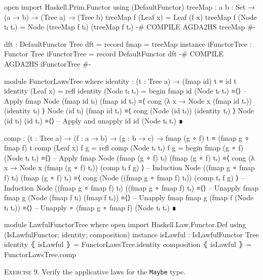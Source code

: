 \documentclass{article}
\begin{document}
\begin{code}
open import Haskell.Prim.Functor using (DefaultFunctor)
treeMap : {a b : Set} → (a → b) → (Tree a) → (Tree b)
treeMap f (Leaf x) = Leaf (f x)
treeMap f (Node tₗ tᵣ) = Node (treeMap f tₗ) (treeMap f tᵣ)
{-# COMPILE AGDA2HS treeMap #-}
\end{code}
\begin{code}
dft : DefaultFunctor Tree
dft = record { fmap = treeMap }
instance
  iFunctorTree : Functor Tree
  iFunctorTree = record { DefaultFunctor dft }
  {-# COMPILE AGDA2HS iFunctorTree #-}
\end{code}
\begin{code}
module FunctorLawsTree where
  identity : (t : Tree a) → (fmap id) t ≡ id t
  identity (Leaf x) = refl
  identity (Node tₗ tᵣ) =
    begin
      fmap id (Node tₗ tᵣ)
    ≡⟨⟩ -- Apply fmap
      Node (fmap id tₗ) (fmap id tᵣ)
    ≡⟨ cong (λ x → Node x (fmap id tᵣ)) (identity tₗ) ⟩
      Node (id tₗ) (fmap id tᵣ)
    ≡⟨ cong (Node (id tₗ)) (identity tᵣ) ⟩
      Node (id tₗ) (id tᵣ)
    ≡⟨⟩ -- Apply and unapply id
      id (Node tₗ tᵣ)
    ∎
\end{code}
\begin{code}
  comp : (t : Tree a) → (f : a → b) → (g : b → c)
    → fmap (g ∘ f) t ≡ (fmap g ∘ fmap f) t
  comp (Leaf x) f g = refl
  comp (Node tₗ tᵣ) f g =
    begin
      fmap (g ∘ f) (Node tₗ tᵣ)
    ≡⟨⟩ -- Apply fmap
      Node (fmap (g ∘ f) tₗ) (fmap (g ∘ f) tᵣ)
    ≡⟨ cong (λ x → Node x (fmap (g ∘ f) tᵣ)) (comp tₗ f g) ⟩ -- Induction
      Node ((fmap g ∘ fmap f) tₗ) (fmap (g ∘ f) tᵣ)
    ≡⟨ cong (Node ((fmap g ∘ fmap f) tₗ)) (comp tᵣ f g) ⟩ -- Induction
      Node ((fmap g ∘ fmap f) tₗ) ((fmap g ∘ fmap f) tᵣ)
    ≡⟨⟩ -- Unapply fmap
      fmap g (Node (fmap f tₗ) (fmap f tᵣ))
    ≡⟨⟩ -- Unapply fmap
      fmap g (fmap f (Node tₗ tᵣ))
    ≡⟨⟩ -- Unapply ∘
      (fmap g ∘ fmap f) (Node tₗ tᵣ)
    ∎
\end{code}
\begin{code}
module LawfulFunctorTree where
  open import Haskell.Law.Functor.Def
    using (IsLawfulFunctor; identity; composition)
  instance
    isLawful : IsLawfulFunctor Tree
    identity ⦃ isLawful ⦄ = FunctorLawsTree.identity
    composition ⦃ isLawful ⦄ = FunctorLawsTree.comp
\end{code}

\noindent
\textsc{Exercise 9.} Verify the applicative laws for the \texttt{Maybe} type.
\end{document}
